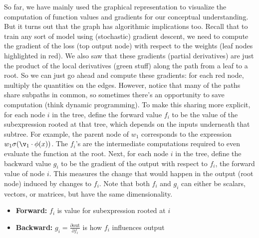 \br



So far, we have mainly used the graphical representation to visualize the computation of function values and gradients for our conceptual understanding.
%
But it turns out that the graph has algorithmic implications too.
%
Recall that to train any sort of model using (stochastic) gradient descent, we need to compute the gradient of the loss (top output node)
%
with respect to the weights (leaf nodes highlighted in red).
%
We also saw that these gradients (partial derivatives) are just the product of the local derivatives (green stuff) along the path from a leaf to a root.
%
So we can just go ahead and compute these gradients: for each red node, multiply the quantities on the edges.
%
However, notice that many of the paths share subpaths in common, so sometimes there's an opportunity to save computation (think dynamic programming).
%
To make this sharing more explicit,
%
for each node $i$ in the tree, define the forward value $f_i$ to be the value of the subexpression rooted at that tree,
%
which depends on the inputs underneath that subtree.
%
For example, the parent node of $w_1$ corresponds to the expression $w_1 \sigma(\v_1 \cdot \phi(x))$.
%
The $f_i$'s are the intermediate computations required to even evaluate the function at the root.
%
Next, for each node $i$ in the tree, define the backward value $g_i$ to be the gradient of the output with respect to $f_i$, the forward value of node $i$.
%
This measures the change that would happen in the output (root node) induced by changes to $f_i$.
%
Note that both $f_i$ and $g_i$ can either be scalars, vectors, or matrices, but have the same dimensionality.

\begin{example}
\begin{itemize}
	\item \textbf{Forward:} $f_i$ is value for subexpression rooted at $i$
	\item \textbf{Backward:} $g_i = \frac{\partial \text{out}}{\partial f_i}$ is how $f_i$ influences output
\end{itemize}
\end{example}

